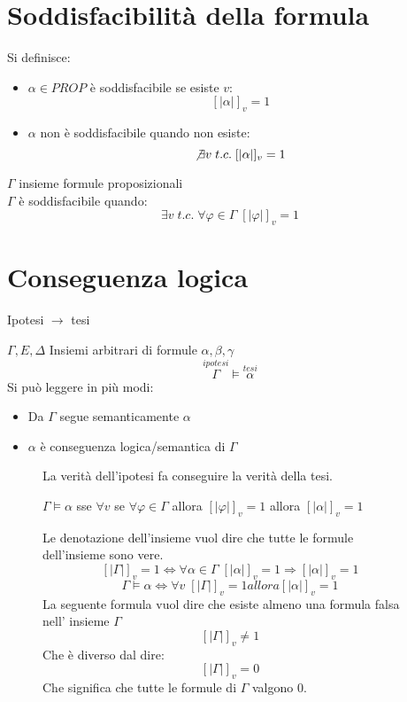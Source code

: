 \documentclass{article}
\theoremstyle{break}
\theoremstyle{break}
\theoremstyle{break}
\theoremstyle{break}
\begin{document}
\section{Soddisfacibilità della formula}
Si definisce:
\begin{itemize}
	\item \( \alpha \in PROP \) è soddisfacibile se esiste \( v \):
	      \[
		      [|\alpha|]_v = 1
	      \]
	\item \( \alpha \) non è soddisfacibile quando non esiste:
	      \[
		      \not\exists v\; t.c.\; [|\alpha|]_v = 1
	      \]
\end{itemize}
\( \Gamma \) insieme formule proposizionali\\
\( \Gamma \) è soddisfacibile quando:
\[
	\exists v\; t.c.\; \forall \varphi \in \Gamma\; [|\varphi|]_v = 1
\]
\section{Conseguenza logica}
\begin{center}
	Ipotesi \( \to  \) tesi
\end{center}
\( \Gamma, E, \Delta \) Insiemi arbitrari di formule \( \alpha, \beta, \gamma \)
\[
	\stackrel{ipotesi}{\Gamma} \models \stackrel{tesi}{\alpha}
\]
Si può leggere in più modi:
\begin{itemize}
	\item Da \( \Gamma \) segue semanticamente \( \alpha \)
	\item \( \alpha \) è conseguenza logica/semantica di \( \Gamma \)
\end{itemize}
\begin{figure}[H]
	\begin{definition}
		La verità dell'ipotesi fa conseguire la verità della tesi.
		\begin{center}
			\( \Gamma \models \alpha \) sse \( \forall v \) se \( \forall \varphi \in \Gamma \) allora \( [|\varphi|]_v = 1 \) allora \( [|\alpha|]_v = 1 \)
		\end{center}
		Le denotazione dell'insieme vuol dire che tutte le formule dell'insieme
		sono vere.
		\[
			[|\Gamma|]_v=1 \Leftrightarrow \forall \alpha \in \Gamma\; [|\alpha|]_v = 1 \Rightarrow [|\alpha|]_v = 1
		\]
		\[
			\Gamma \models \alpha \Leftrightarrow \forall v\; [|\Gamma|]_v=1 allora [|\alpha|]_v=1
		\]
		La seguente formula vuol dire che esiste almeno una formula falsa nell'
		insieme \( \Gamma \)
		\[
			[|\Gamma|]_v \neq 1
		\]
		Che è diverso dal dire:
		\[
			[|\Gamma|]_v = 0
		\]
		Che significa che tutte le formule di \( \Gamma \) valgono 0.
	\end{definition}
\end{figure}
\end{document}
